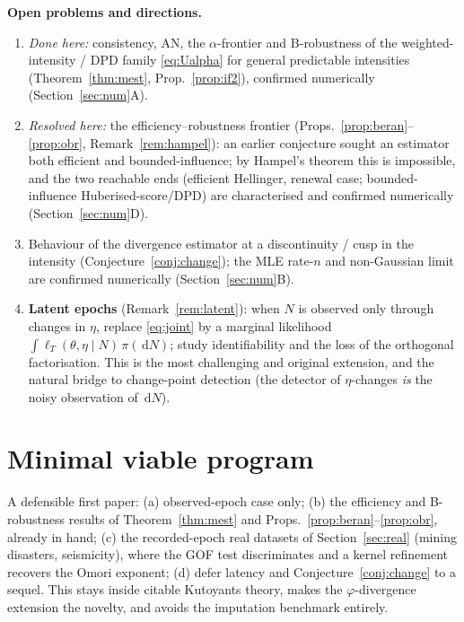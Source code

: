 \documentclass[smallextended,natbib]{svjour3}
\newcommand{\dd}{\,\mathrm{d}}
\begin{document}
\medskip
\noindent\textbf{Open problems and directions.}
\begin{enumerate}
\item[\checkmark] \emph{Done here:} consistency, AN, the $\alpha$-frontier and
B-robustness of the weighted-intensity / DPD family \eqref{eq:Ualpha} for general
predictable intensities (Theorem~\ref{thm:mest}, Prop.~\ref{prop:if2}),
confirmed numerically (Section~\ref{sec:num}A).
\item[\checkmark] \emph{Resolved here:} the efficiency--robustness frontier
(Props.~\ref{prop:beran}--\ref{prop:obr}, Remark~\ref{rem:hampel}): an earlier
conjecture sought an estimator both efficient and bounded-influence; by Hampel's
theorem this is impossible, and the two reachable ends (efficient Hellinger, renewal
case; bounded-influence Huberised-score/DPD) are characterised and confirmed
numerically (Section~\ref{sec:num}D).
\item Behaviour of the divergence estimator at a discontinuity / cusp in the
intensity (Conjecture~\ref{conj:change}); the MLE rate-$n$ and non-Gaussian limit
are confirmed numerically (Section~\ref{sec:num}B).
\item \textbf{Latent epochs} (Remark~\ref{rem:latent}): when $N$ is observed only
through changes in $\eta$, replace \eqref{eq:joint} by a marginal likelihood
$\int \ell_T(\theta,\eta\mid N)\,\pi(\dd N)$; study identifiability and the loss
of the orthogonal factorisation. This is the most challenging and original
extension, and the natural bridge to change-point detection (the detector of
$\eta$-changes \emph{is} the noisy observation of $\dd N$).
\end{enumerate}

\section{Minimal viable program}
A defensible first paper: (a) observed-epoch case only; (b) the efficiency and
B-robustness results of Theorem~\ref{thm:mest} and Props.~\ref{prop:beran}--\ref{prop:obr}, already in
hand; (c) the recorded-epoch real datasets of Section~\ref{sec:real} (mining
disasters, seismicity), where the GOF test discriminates and a kernel refinement
recovers the Omori exponent; (d) defer latency and Conjecture~\ref{conj:change} to a
sequel. This stays inside citable Kutoyants
theory, makes the $\varphi$-divergence extension the novelty, and avoids the
imputation benchmark entirely.

\appendix
\end{document}
